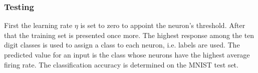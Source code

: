 \subsubsection{Testing}
First the learning rate $\eta$ is set to zero to appoint the neuron's threshold.
After that the training set is presented once more.
The highest response among the ten digit classes is used to assign a class to each neuron, i.e. labels are used.
The predicted value for an input is the class whose neurons have the highest average firing rate.
The classification accuracy is determined on the MNIST test set.